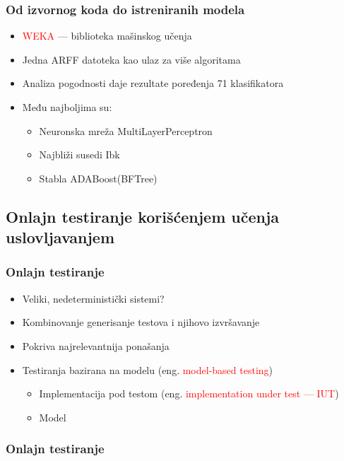 \documentclass[11pt]{beamer}
\theoremstyle{definition}
\begin{document}
{\begin{frame}
\frametitle{Od izvornog koda do istreniranih modela}
\begin{itemize}


\item \textcolor{red}{WEKA} --- biblioteka mašinskog učenja
\item Jedna ARFF datoteka kao ulaz za više algoritama

\item Analiza pogodnosti daje rezultate poređenja 71 klasifikatora

\item Među najboljima su:
\begin{itemize}
	\item Neuronska mreža MultiLayerPerceptron
	\item Najbliži susedi Ibk
	\item Stabla ADABoost(BFTree)
\end{itemize}
\end{itemize}
\end{frame}

\subsection{Onlajn testiranje korišćenjem učenja uslovljavanjem}
\label{subsec:online-rl}
\begin{frame}
\frametitle{Onlajn testiranje}

\begin{itemize}
	\item Veliki, nedeterministički sistemi?
	\item Kombinovanje generisanje testova i njihovo izvršavanje
	\item Pokriva najrelevantnija ponašanja
	\item Testiranja bazirana na modelu (eng. \textcolor{red}{model-based testing})
	\begin{itemize}
		\item Implementacija pod testom \newline (eng. \textcolor{red}{implementation under test --- IUT})
		\item Model	
	\end{itemize}
\end{itemize}

\end{frame}

\begin{frame}
\frametitle{Onlajn testiranje}


\end{frame}}
\end{document}
